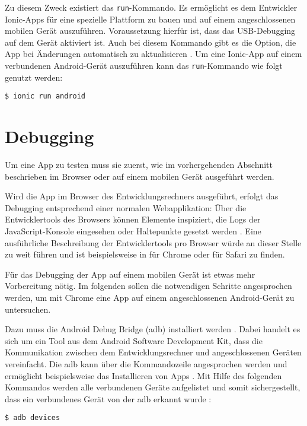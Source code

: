 Zu diesem Zweck existiert das \texttt{run}-Kommando. Es ermöglicht es dem Entwickler Ionic-Apps für eine spezielle Plattform zu bauen und auf einem angeschlossenen mobilen Gerät auszuführen. Voraussetzung hierfür ist, dass das USB-Debugging auf dem Gerät aktiviert ist. Auch bei diesem Kommando gibt es die Option, die App bei Änderungen automatisch zu aktualisieren \cite{ionic:run}. Um eine Ionic-App auf einem verbundenen Android-Gerät auszuführen kann das \texttt{run}-Kommando wie folgt genutzt werden:
\begin{codebox}
\begin{lstlisting}[style=typescript]
$ ionic run android
\end{lstlisting}
\end{codebox}

\section{Debugging}

Um eine App zu testen muss sie zuerst, wie im vorhergehenden Abschnitt beschrieben im Browser oder auf einem mobilen Gerät ausgeführt werden. 

Wird die App im Browser des Entwicklungsrechners ausgeführt, erfolgt das Debugging entsprechend einer normalen Webapplikation: Über die Entwicklertools des Browsers können Elemente inspiziert, die Logs der JavaScript-Konsole eingesehen oder Haltepunkte gesetzt werden \cite{ionic:tips}. Eine ausführliche Beschreibung der Entwicklertools pro Browser würde an dieser Stelle zu weit führen und ist beispielsweise in \cite{google:chrome} für Chrome oder \cite{apple:safari} für Safari zu finden.

Für das Debugging der App auf einem mobilen Gerät ist etwas mehr Vorbereitung nötig. Im folgenden sollen die notwendigen Schritte angesprochen werden, um mit Chrome eine App auf einem angeschlossenen Android-Gerät zu untersuchen.

Dazu muss die Android Debug Bridge (adb) installiert werden \cite{ionic:tips}. Dabei handelt es sich um ein Tool aus dem Android Software Development Kit, dass die Kommunikation zwischen dem Entwicklungsrechner und angeschlossenen Geräten vereinfacht. Die adb kann über die Kommandozeile angesprochen werden und ermöglicht beispielsweise das Installieren von Apps \cite{google:adb}. Mit Hilfe des folgenden Kommandos werden alle verbundenen Geräte aufgelistet und somit sichergestellt, dass ein verbundenes Gerät von der adb erkannt wurde \cite{ionic:tips}:
\begin{codebox}
\begin{lstlisting}[style=typescript]
$ adb devices
\end{lstlisting}
\end{codebox}

